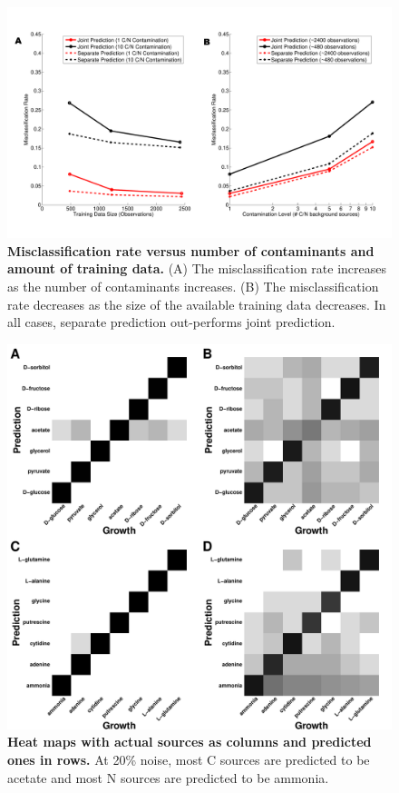 \documentclass[12pt]{article}
\begin{document}
\clearpage
\begin{figure}[!ht]
\centerline{\includegraphics[width=6in]{Figures/CombinedContaminationTrainingdata.pdf}}
\caption{\label{fig:misclassification}\textbf{Misclassification rate versus number of contaminants and amount of training data.} (A) The misclassification rate increases as the number of contaminants increases. (B) The misclassification rate decreases as the size of the available training data decreases. In all cases, separate prediction out-performs joint prediction.}
\end{figure}

\clearpage
\begin{figure}[p]
\centerline{\includegraphics[width=6in]{Figures/heatmap.pdf}}
\caption{\label{fig:heat_map}\textbf{Heat maps with actual sources as columns and predicted ones in rows.}  At 20\% noise, most C sources are predicted to be acetate and most N sources are predicted to be ammonia.}
\end{figure}
\end{document}
